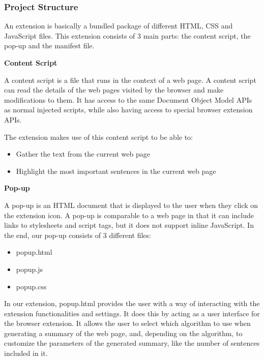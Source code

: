\documentclass[conference,compsoc]{IEEEtran}
\begin{document}
\subsubsection{Project Structure}

An extension is basically a bundled package of different HTML, CSS and JavaScript files.
This extension consists of 3 main parts: the content script, the pop-up and the manifest file.

\vspace{0.4cm}
\textbf{Content Script}

A content script is a file that runs in the context of a web page.
A content script can read the details of the web pages visited by the browser and make modifications to them.
It has access to the same Document Object Model APIs as normal injected scripts, while also having access to special browser extension APIs.

The extension makes use of this content script to be able to:

\begin{itemize}
  \item Gather the text from the current web page
  \item Highlight the most important sentences in the current web page
\end{itemize}

\vspace{0.4cm}
\textbf{Pop-up}

A pop-up is an HTML document that is displayed to the user when they click on the extension icon.
A pop-up is comparable to a web page in that it can include links to stylesheets and script tags, but it does not support inline JavaScript.
In the end, our pop-up consists of 3 different files:

\begin{itemize}
  \item popup.html
  \item popup.js
  \item popup.css
\end{itemize}

In our extension, popup.html provides the user with a way of interacting with the extension functionalities and settings.
It does this by acting as a user interface for the browser extension.
It allows the user to select which algorithm to use when generating a summary of the web page, and, depending on the algorithm, to customize the parameters of the generated summary, like the number of sentences included in it.
\end{document}
